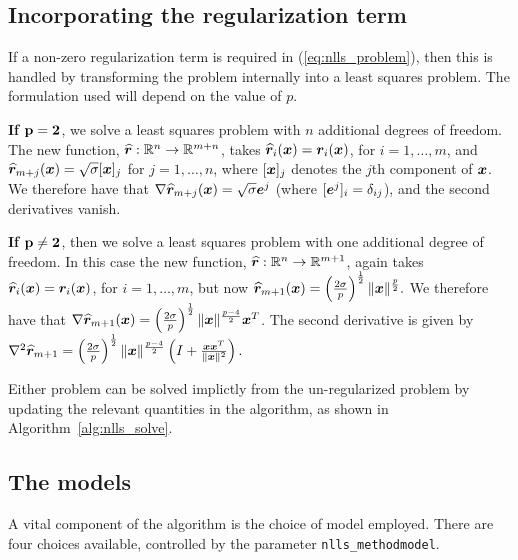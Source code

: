 \subsection{Incorporating the regularization term}
\label{sec:reg_problem}

If a non-zero regularization term is required in (\ref{eq:nlls_problem}), then this is handled by transforming the problem internally into a least squares problem.  The 
formulation used will depend on the value of $p$.

{\bf If $\bf p = 2$}, we solve a least squares problem with $n$ additional degrees of freedom.
The new function, $\widehat{{\bm r}} : \mathbb{R}^{n}\rightarrow\mathbb{R}^{m+n}$, takes $\widehat{{\bm r}}_i({\bm x}) = {\bm r}_i({\bm x})$, for $i = 1,\dots, m$, and $\widehat{{\bm r}}_{m+j}({\bm x}) =
\sqrt{\sigma}[{\bm x}]_j$ for $j = 1,\dots, n$, where $[{\bm x}]_j$ denotes the $j$th component of ${\bm x}$.  We therefore have that $\nabla \widehat{{\bm r}}_{m+j}({\bm x}) = \sqrt{\sigma}{\bm e}^j$ (where $[{\bm e}^j]_i = \delta_{ij}$), and the second derivatives vanish.

{\bf If $\bf p \ne 2$}, then we solve a least squares problem
 with one additional degree of freedom.  In this case the new function, $\widehat{{\bm r}} : \mathbb{R}^{n}\rightarrow\mathbb{R}^{m+1}$, again takes $\widehat{{\bm r}}_i({\bm x}) = {\bm r}_i({\bm x})$, for $i = 1,\dots, m$, but now $\widehat{{\bm r}}_{m+1}({\bm x}) = \left(\frac{2\sigma}{p}\right)^{\frac{1}{2}}\|{\bm x}\|^{\frac{p}{2}}.$  We therefore have that 
$\nabla \widehat{{\bm r}}_{m+1}({\bm x}) = \left(\frac{2\sigma}{p}\right)^{\frac{1}{2}}\|{\bm x}\|^{\frac{p-4}{2}}{\bm x}^T$.  
The second derivative is given by %
\(
\nabla^2\widehat{\vr}_{m+1} =
   \left(\frac{2\sigma}{p}\right)^{\frac{1}{2}}\|\vx\|^{\frac{p-4}{2}}\left(I + \frac{\vx\vx^T}{\|\vx\|^2}\right).%
\)


Either problem can be solved implictly from the un-regularized problem by updating the relevant quantities in the algorithm, as shown in Algorithm~\ref{alg:nlls_solve}.

\subsection{The models}
\label{sec:model_description}

A vital component of the algorithm is the choice of model employed.  There are four choices
available, controlled by the parameter {\tt  nlls\_method\ct model}.

